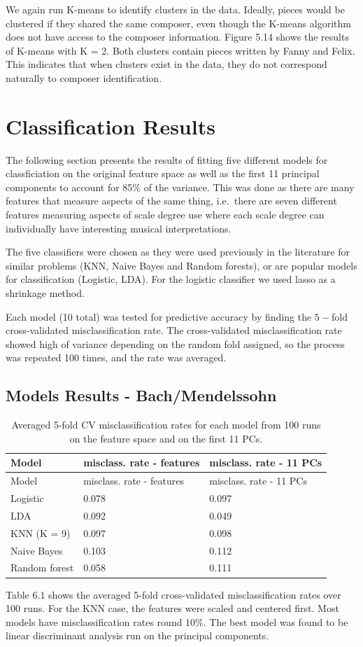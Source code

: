 \documentclass[12pt,twoside]{reedthesis}
\theoremstyle{definition}
\theoremstyle{definition}
\theoremstyle{definition}
\theoremstyle{remark}
\begin{document}
We again run K-means to identify clusters in the data. Ideally, pieces
would be clustered if they shared the same composer, even though the
K-means algorithm does not have access to the composer information.
Figure 5.14 shows the results of K-means with K = 2. Both clusters
contain pieces written by Fanny and Felix. This indicates that when
clusters exist in the data, they do not correspond naturally to composer
identification.

\chapter{Classification Results}\label{classification-results}

The following section presents the results of fitting five different
models for classficiation on the original feature space as well as the
first 11 principal components to account for 85\% of the variance. This
was done as there are many features that measure aspects of the same
thing, i.e.~there are seven different features measuring aspects of
scale degree use where each scale degree can individually have
interesting musical interpretations.

The five classifiers were chosen as they were used previously in the
literature for similar problems (KNN, Naive Bayes and Random forests),
or are popular models for classification (Logistic, LDA). For the
logistic classifier we used lasso as a shrinkage method.

Each model (10 total) was tested for predictive accuracy by finding the
\(5-\)fold cross-validated misclassification rate. The cross-validated
misclassification rate showed high of variance depending on the random
fold assigned, so the process was repeated 100 times, and the rate was
averaged.

\section{Models Results -
Bach/Mendelssohn}\label{models-results---bachmendelssohn}
\begin{longtable}[]{@{}lll@{}}
\caption{Averaged 5-fold CV misclassification rates for each model from
100 runs on the feature space and on the first 11 PCs.}\tabularnewline
\toprule
Model & misclass. rate - features & misclass. rate - 11
PCs\tabularnewline
\midrule
\endfirsthead
\toprule
Model & misclass. rate - features & misclass. rate - 11
PCs\tabularnewline
\midrule
\endhead
Logistic & 0.078 & 0.097\tabularnewline
LDA & 0.092 & 0.049\tabularnewline
KNN (K = 9) & 0.097 & 0.098\tabularnewline
Naive Bayes & 0.103 & 0.112\tabularnewline
Random forest & 0.058 & 0.111\tabularnewline
\bottomrule
\end{longtable}
Table 6.1 shows the averaged 5-fold cross-validated misclassification
rates over 100 runs. For the KNN case, the features were scaled and
centered first. Most models have misclassification rates round 10\%. The
best model was found to be linear discriminant analysis run on the
principal components.
\end{document}
